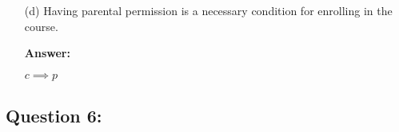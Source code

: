 \documentclass[12pt]{extreport}
\newcommand{\answer}[0]{\medskip \textbf{Answer:} \medskip}
\begin{document}
\begin{enumerate}
\begin{enumerate}
                \answer

                \( c \implies p \)

            \item[(d)] Having parental permission is a necessary condition for enrolling in the course.
        
                \answer

                \( c \implies p \)

        \end{enumerate}

\end{enumerate}
\newpage

\subsection*{Question 6:}
\end{document}
